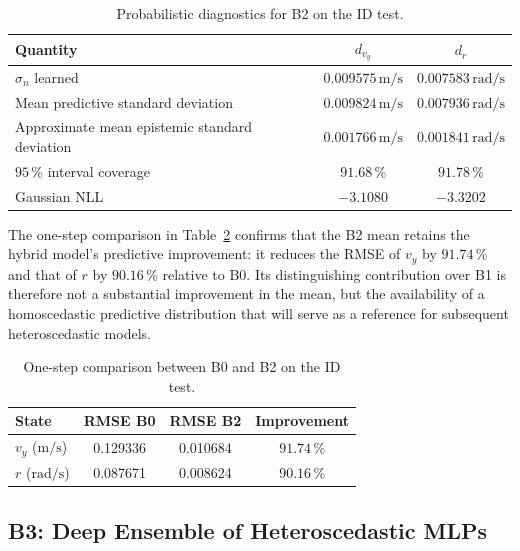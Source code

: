 \documentclass[12pt,a4paper]{report}
\begin{document}
\begin{table}[htbp]
    \centering
    \caption{Probabilistic diagnostics for B2 on the ID test.}
    \label{tab:b2_uncertainty_diagnostics}
    \begin{tabular}{@{}lcc@{}}
        \toprule
        Quantity & $d_{v_y}$ & $d_r$ \\
        \midrule
        $\sigma_n$ learned
            & $0.009575\,\mathrm{m/s}$ & $0.007583\,\mathrm{rad/s}$ \\
        Mean predictive standard deviation
            & $0.009824\,\mathrm{m/s}$ & $0.007936\,\mathrm{rad/s}$ \\
        Approximate mean epistemic standard deviation
            & $0.001766\,\mathrm{m/s}$ & $0.001841\,\mathrm{rad/s}$ \\
        $95$\,\% interval coverage
            & $91.68$\,\% & $91.78$\,\% \\
        Gaussian NLL
            & $-3.1080$ & $-3.3202$ \\
        \bottomrule
    \end{tabular}
\end{table}

The one-step comparison in Table~\ref{tab:b2_physics_hybrid_comparison} confirms that the B2 mean retains the hybrid model's predictive improvement: it reduces the RMSE of $v_y$ by $91.74$\,\% and that of $r$ by $90.16$\,\% relative to B0. Its distinguishing contribution over B1 is therefore not a substantial improvement in the mean, but the availability of a homoscedastic predictive distribution that will serve as a reference for subsequent heteroscedastic models.

\begin{table}[htbp]
    \centering
    \caption{One-step comparison between B0 and B2 on the ID test.}
    \label{tab:b2_physics_hybrid_comparison}
    \begin{tabular}{@{}lccc@{}}
        \toprule
        State & RMSE B0 & RMSE B2 & Improvement \\
        \midrule
        $v_y$ ($\mathrm{m/s}$) & 0.129336 & 0.010684 & $91.74$\,\% \\
        $r$ ($\mathrm{rad/s}$) & 0.087671 & 0.008624 & $90.16$\,\% \\
        \bottomrule
    \end{tabular}
\end{table}

\subsection{B3: Deep Ensemble of Heteroscedastic MLPs}
\label{sec:modelo_b3}
\end{document}
